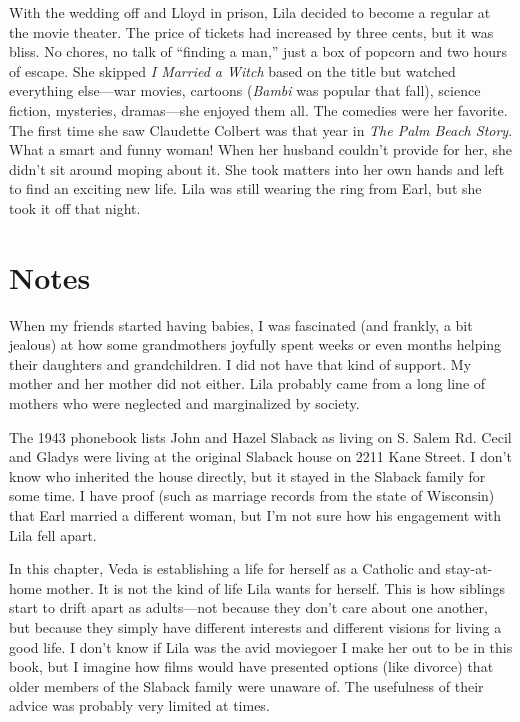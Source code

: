 \documentclass[
  letterpaper,
]{book}
\begin{document}
With the wedding off and Lloyd in prison, Lila decided to become a
regular at the movie theater. The price of tickets had increased by
three cents, but it was bliss. No chores, no talk of ``finding a man,''
just a box of popcorn and two hours of escape. She skipped \emph{I
Married a Witch} based on the title but watched everything else---war
movies, cartoons (\emph{Bambi} was popular that fall), science fiction,
mysteries, dramas---she enjoyed them all. The comedies were her
favorite. The first time she saw Claudette Colbert was that year in
\emph{The Palm Beach Story}. What a smart and funny woman! When her
husband couldn't provide for her, she didn't sit around moping about it.
She took matters into her own hands and left to find an exciting new
life. Lila was still wearing the ring from Earl, but she took it off
that night.

\section{Notes}\label{notes-27}

When my friends started having babies, I was fascinated (and frankly, a
bit jealous) at how some grandmothers joyfully spent weeks or even
months helping their daughters and grandchildren. I did not have that
kind of support. My mother and her mother did not either. Lila probably
came from a long line of mothers who were neglected and marginalized by
society.

The 1943 phonebook lists John and Hazel Slaback as living on S. Salem
Rd. Cecil and Gladys were living at the original Slaback house on 2211
Kane Street. I don't know who inherited the house directly, but it
stayed in the Slaback family for some time. I have proof (such as
marriage records from the state of Wisconsin) that Earl married a
different woman, but I'm not sure how his engagement with Lila fell
apart.

In this chapter, Veda is establishing a life for herself as a Catholic
and stay-at-home mother. It is not the kind of life Lila wants for
herself. This is how siblings start to drift apart as adults---not
because they don't care about one another, but because they simply have
different interests and different visions for living a good life. I
don't know if Lila was the avid moviegoer I make her out to be in this
book, but I imagine how films would have presented options (like
divorce) that older members of the Slaback family were unaware of. The
usefulness of their advice was probably very limited at times.
\end{document}
